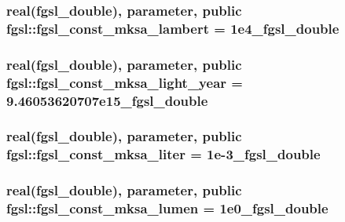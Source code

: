 \hypertarget{classfgsl_abb530767690eea1cf7e8d6d99141ae41}{
\subsubsection[{fgsl\-\_\-const\-\_\-mksa\-\_\-lambert}]{\setlength{\rightskip}{0pt plus 5cm}real({\bf fgsl\-\_\-double}), parameter, public fgsl\-::fgsl\-\_\-const\-\_\-mksa\-\_\-lambert = 1e4\-\_\-fgsl\-\_\-double}}\label{classfgsl_abb530767690eea1cf7e8d6d99141ae41}
\hypertarget{classfgsl_ac9efe31fa2e902dc8cced7ce8b82c610}{
\subsubsection[{fgsl\-\_\-const\-\_\-mksa\-\_\-light\-\_\-year}]{\setlength{\rightskip}{0pt plus 5cm}real({\bf fgsl\-\_\-double}), parameter, public fgsl\-::fgsl\-\_\-const\-\_\-mksa\-\_\-light\-\_\-year = 9.\-46053620707e15\-\_\-fgsl\-\_\-double}}\label{classfgsl_ac9efe31fa2e902dc8cced7ce8b82c610}
\hypertarget{classfgsl_ac989bb9124679e7e571cef06c81e5fe3}{
\subsubsection[{fgsl\-\_\-const\-\_\-mksa\-\_\-liter}]{\setlength{\rightskip}{0pt plus 5cm}real({\bf fgsl\-\_\-double}), parameter, public fgsl\-::fgsl\-\_\-const\-\_\-mksa\-\_\-liter = 1e-\/3\-\_\-fgsl\-\_\-double}}\label{classfgsl_ac989bb9124679e7e571cef06c81e5fe3}
\hypertarget{classfgsl_a7bb4dd075b4ec4613ff976153a8a42dd}{
\subsubsection[{fgsl\-\_\-const\-\_\-mksa\-\_\-lumen}]{\setlength{\rightskip}{0pt plus 5cm}real({\bf fgsl\-\_\-double}), parameter, public fgsl\-::fgsl\-\_\-const\-\_\-mksa\-\_\-lumen = 1e0\-\_\-fgsl\-\_\-double}}\label{classfgsl_a7bb4dd075b4ec4613ff976153a8a42dd}

